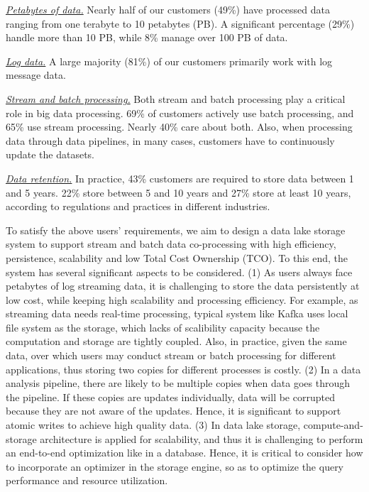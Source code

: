\noindent \underline{\textit{Petabytes of data.}} Nearly half of our customers (49\%) have processed data ranging from one terabyte to 10 petabytes (PB). A significant percentage (29\%) handle more than 10 PB, while 8\% manage over 100 PB of data.


\noindent \underline{\textit{Log data.}} A large majority (81\%) of our customers primarily work with log message data.

\noindent \underline{\textit{Stream and batch processing.}} Both stream and batch processing play a critical role in big data processing. 69\% of  customers actively use batch processing, and 65\% use stream processing. Nearly 40\%  care about both. 
Also, when processing data through data pipelines, in many cases, customers  have to continuously  update the datasets.

\noindent \underline{\textit{Data retention.}} In practice, 43\% customers are required to store data between 1 and 5 years. 22\% store between 5 and 10 years and 27\% store at least 10 years, according to regulations and practices in different industries.


To satisfy the above users' requirements, we aim to design a data lake storage system to support stream and batch data co-processing with high efficiency, persistence, scalability and low Total Cost Ownership (TCO). To this end, the system has several significant aspects  to be considered. (1) As users always face petabytes of log streaming data, it is challenging to store the data persistently at low cost, while keeping high scalability and processing efficiency. For example, as streaming data needs real-time processing,  typical system like Kafka uses local file system as the storage, which lacks of scalibility capacity because the computation and storage are tightly coupled. Also, in practice, given the same data, over which users may conduct stream or batch processing for different applications, thus storing two copies for different processes is costly.
(2) In a data analysis pipeline, there are likely to be multiple copies when data goes through the pipeline. If these copies are updates individually, data  will be corrupted because   they are not aware of the updates.   
 Hence, it is significant to support atomic writes to achieve high quality data.
(3) In data lake storage, compute-and-storage  architecture  is applied for scalability,  and thus it is challenging to perform an end-to-end optimization like in a database. Hence, it is critical to consider how to incorporate an optimizer in the storage engine, so as to optimize the query performance and resource utilization.

